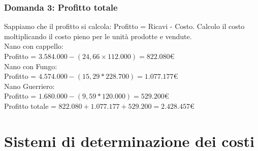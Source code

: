 \documentclass{article}
\begin{document}
\subsubsection{Domanda 3: Profitto totale}
Sappiamo che il profitto si calcola: Profitto = Ricavi - Costo. Calcolo il costo moltiplicando il costo pieno per le unità prodotte e vendute.
\vspace*{0.2cm}\\
Nano con cappello:\\
Profitto = $ 3.584.000 - (24,66 \times 112.000) = 822.080$\euro 
\vspace*{0.1cm}\\
Nano con Fungo:\\
Profitto = $4.574.000 - (15,29 * 228.700)= 1.077.177$\euro 
\vspace*{0.2cm}\\
Nano Guerriero:\\
Profitto = $1.680.000 - (9,59 * 120.000) = 529.200$\euro 
\vspace*{0.2cm}\\
Profitto totale = $ 822.080 + 1.077.177 + 529.200 = 2.428.457$\euro   






\section{Sistemi di determinazione dei costi}
\end{document}
